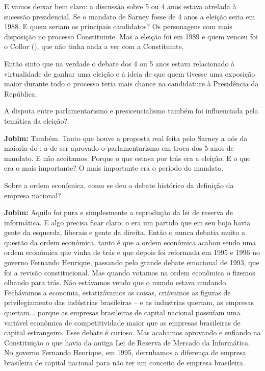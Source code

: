 E vamos deixar bem claro: a discussão sobre 5 ou 4 anos estava atrelada
à sucessão presidencial. Se o mandato de Sarney fosse de 4 anos a
eleição seria em 1988. E quem seriam os principais candidatos? Os
personagens com mais disposição no processo Constituinte. Mas a eleição
foi em 1989 e quem venceu foi o Collor (), que não tinha nada a ver
com a Constituinte.

Então sinto que na verdade o debate dos 4 ou 5 anos estava relacionado à
virtualidade de ganhar uma eleição e à ideia de que quem tivesse uma
exposição maior durante todo o processo teria mais chance na candidature
à Presidência da República.

A disputa entre parlamentarismo e presicencialismo também foi
influenciada pela temática da eleição?

\textbf{Jobim:} Também. Tanto que houve a proposta real feita pelo
Sarney a nós da maioria do : a de ser aprovado o parlamentarismo em
troca dos 5 anos de mandato. E não aceitamos. Porque o que estava por
trás era a eleição. E o que era o mais importante? O mais importante era
o periodo do mandato.

Sobre a ordem econômica, como se deu o debate histórico da definição da
empresa nacional?

\textbf{Jobim:} Aquilo foi pura e simplesmente a reprodução da lei de
reserva de informática. E algo precisa ficar claro: o  era um
partido que em seu bojo havia gente da esquerda, liberais e gente da
direita. Então o  nunca debatia muito a questão da ordem econômica,
tanto é que a ordem econômica acabou sendo uma ordem econômica que vinha
de trás e que depois foi reformada em 1995 e 1996 no governo Fernando
Henrique, passando pelo grande debate emocional de 1993, que foi a
revisão constitucional. Mas quando votamos na ordem econômica o fizemos
olhando para trás. Não estávamos vendo que o mundo estava mudando.
Fechávamos a economia, estatizávamos as coisas, criávamos as figuras de
privilegiamento das indústrias brasileiras -- e as industrias queriam,
as empresas queriam... porque as empresas brasileiras de capital
nacional possuíam uma variável econômica de competitividade maior que as
empresas brasileiras de capital estrangeiro. Esse debate é curioso. Mas
acabamos aprovando e enfiando na Constituição o que havia da antiga Lei
de Reserva de Mercado da Informática. No governo Fernando Henrique, em
1995, derrubamos a diferença de empresa brasileira de capital nacional
para não ter um conceito de empresa brasileira.

